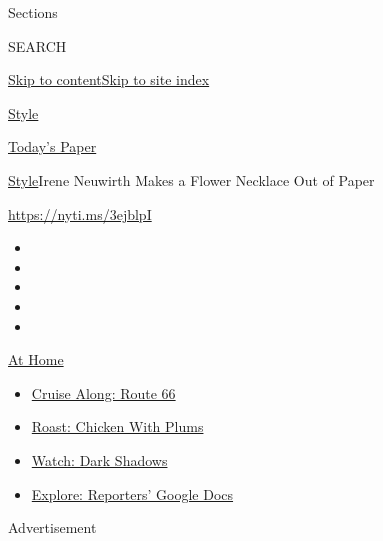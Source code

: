 Sections

SEARCH

\protect\hyperlink{site-content}{Skip to
content}\protect\hyperlink{site-index}{Skip to site index}

\href{https://www.nytimes3xbfgragh.onion/section/style}{Style}

\href{https://myaccount.nytimes3xbfgragh.onion/auth/login?response_type=cookie\&client_id=vi}{}

\href{https://www.nytimes3xbfgragh.onion/section/todayspaper}{Today's
Paper}

\href{/section/style}{Style}\textbar{}Irene Neuwirth Makes a Flower
Necklace Out of Paper

\url{https://nyti.ms/3ejblpI}

\begin{itemize}
\item
\item
\item
\item
\item
\end{itemize}

\href{https://www.nytimes3xbfgragh.onion/spotlight/at-home?action=click\&pgtype=Article\&state=default\&region=TOP_BANNER\&context=at_home_menu}{At
Home}

\begin{itemize}
\tightlist
\item
  \href{https://www.nytimes3xbfgragh.onion/2020/09/07/travel/route-66.html?action=click\&pgtype=Article\&state=default\&region=TOP_BANNER\&context=at_home_menu}{Cruise
  Along: Route 66}
\item
  \href{https://www.nytimes3xbfgragh.onion/2020/09/04/dining/sheet-pan-chicken.html?action=click\&pgtype=Article\&state=default\&region=TOP_BANNER\&context=at_home_menu}{Roast:
  Chicken With Plums}
\item
  \href{https://www.nytimes3xbfgragh.onion/2020/09/04/arts/television/dark-shadows-stream.html?action=click\&pgtype=Article\&state=default\&region=TOP_BANNER\&context=at_home_menu}{Watch:
  Dark Shadows}
\item
  \href{https://www.nytimes3xbfgragh.onion/interactive/2020/at-home/even-more-reporters-editors-diaries-lists-recommendations.html?action=click\&pgtype=Article\&state=default\&region=TOP_BANNER\&context=at_home_menu}{Explore:
  Reporters' Google Docs}
\end{itemize}

Advertisement

